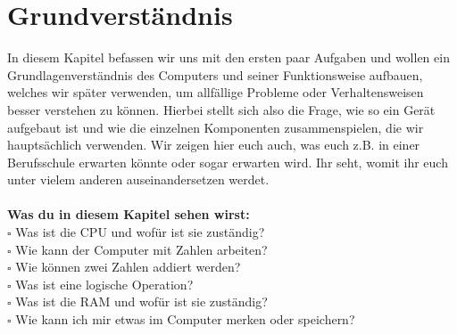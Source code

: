 \newpage
\chapter{Grundverständnis}
In diesem Kapitel befassen wir uns mit den ersten paar Aufgaben und wollen ein Grundlagenverständnis des Computers und
seiner Funktionsweise aufbauen, welches wir später verwenden, um allfällige Probleme oder Verhaltensweisen besser
verstehen zu können. Hierbei stellt sich also die Frage, wie so ein Gerät aufgebaut ist und wie die einzelnen Komponenten zusammenspielen, die
wir hauptsächlich verwenden. Wir zeigen hier euch auch, was euch z.B. in einer Berufsschule erwarten könnte oder sogar erwarten wird. Ihr
seht, womit ihr euch unter vielem anderen auseinandersetzen werdet.\\\\
\textbf{Was du in diesem Kapitel sehen wirst:}\\
$\square$ Was ist die CPU und wofür ist sie zuständig?\\
$\square$ Wie kann der Computer mit Zahlen arbeiten?\\
$\square$ Wie können zwei Zahlen addiert werden?\\
$\square$ Was ist eine logische Operation?\\
$\square$ Was ist die RAM und wofür ist sie zuständig?\\
$\square$ Wie kann ich mir etwas im Computer merken oder speichern?

